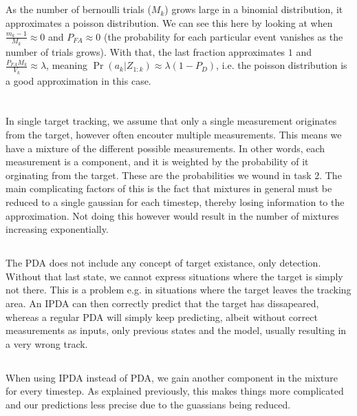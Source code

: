 \documentclass[]{article}
\begin{document}
\subsection{}
As the number of bernoulli trials ($M_k$) grows large in a binomial distribution, it approximates a poisson distribution. We can see this here by looking at when $\frac{m_k - 1}{M_k} \approx 0$ and $P_{FA} \approx 0$ (the probability for each particular event vanishes as the number of trials grows). With that, the last fraction approximates $1$ and $\frac{P_{FA}M_k}{V_k} \approx \lambda$, meaning $\Pr(a_k | Z_{1:k}) \approx \lambda (1 - P_D)$, i.e. the poisson distribution is a good approximation in this case.

\section{}
\subsection{}
In single target tracking, we assume that only a single measurement originates from the target, however often encouter multiple measurements. This means we have a mixture of the different possible measurements. In other words, each measurement is a component, and it is weighted by the probability of it orginating from the target. These are the probabilities we wound in task 2. The main complicating factors of this is the fact that mixtures in general must be reduced to a single gaussian for each timestep, thereby losing information to the approximation. Not doing this however would result in the number of mixtures increasing exponentially.

\subsection{}
The PDA does not include any concept of target existance, only detection. Without that last state, we cannot express situations where the target is simply not there. This is a problem e.g. in situations where the target leaves the tracking area. An IPDA can then correctly predict that the target has dissapeared, whereas a regular PDA will simply keep predicting, albeit without correct measurements as inputs, only previous states and the model, usually resulting in a very wrong track.

\subsection{}
When using IPDA instead of PDA, we gain another component in the mixture for every timestep. As explained previously, this makes things more complicated and our predictions less precise due to the guassians being reduced.

\section{}
\end{document}
